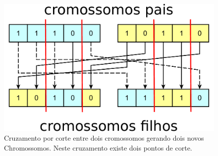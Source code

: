 \documentclass[10pt,a4paper]{article}
\begin{document}
\begin{figure}[H]
  \center
  \includegraphics[scale=0.6]{imgs/diagramaCorte.pdf}            
  \caption{Cruzamento por corte entre dois cromossomos gerando dois novos Chromossomos. Neste cruzamento existe dois pontos de corte.}
  \label{fig:MostrandoOCruzamentoPorCorte}
\end{figure} 
\end{document}
